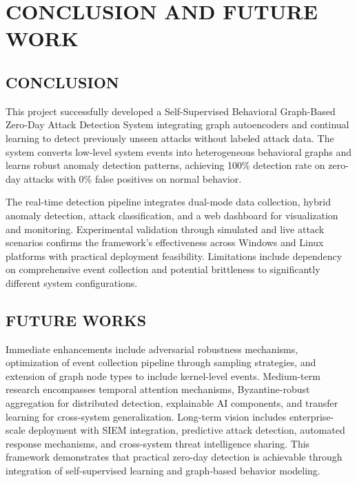 

\chapter{CONCLUSION AND FUTURE WORK}

\section{CONCLUSION}

This project successfully developed a Self-Supervised Behavioral Graph-Based Zero-Day Attack Detection System integrating graph autoencoders and continual learning to detect previously unseen attacks without labeled attack data. The system converts low-level system events into heterogeneous behavioral graphs and learns robust anomaly detection patterns, achieving 100\% detection rate on zero-day attacks with 0\% false positives on normal behavior.

\vspace{0.2cm}

The real-time detection pipeline integrates dual-mode data collection, hybrid anomaly detection, attack classification, and a web dashboard for visualization and monitoring. Experimental validation through simulated and live attack scenarios confirms the framework's effectiveness across Windows and Linux platforms with practical deployment feasibility. Limitations include dependency on comprehensive event collection and potential brittleness to significantly different system configurations.

\section{FUTURE WORKS}

Immediate enhancements include adversarial robustness mechanisms, optimization of event collection pipeline through sampling strategies, and extension of graph node types to include kernel-level events. Medium-term research encompasses temporal attention mechanisms, Byzantine-robust aggregation for distributed detection, explainable AI components, and transfer learning for cross-system generalization. Long-term vision includes enterprise-scale deployment with SIEM integration, predictive attack detection, automated response mechanisms, and cross-system threat intelligence sharing. This framework demonstrates that practical zero-day detection is achievable through integration of self-supervised learning and graph-based behavior modeling.

\clearpage